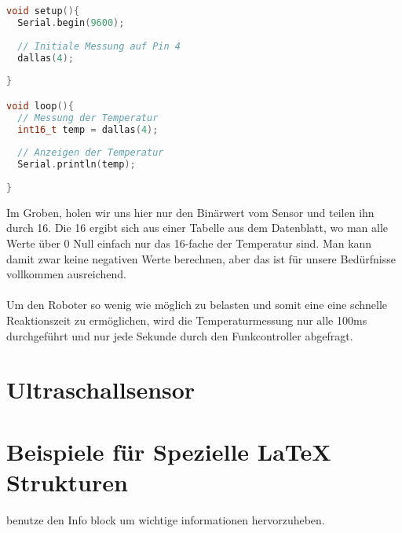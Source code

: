 \documentclass[12pt]{article}
\begin{document}
\begin{file}[DS18B20-2]
		
        \begin{lstlisting}[language=C++, inputencoding={utf8}, extendedchars=false]     
void setup(){
  Serial.begin(9600);
	
  // Initiale Messung auf Pin 4
  dallas(4);
  
}

void loop(){
  // Messung der Temperatur
  int16_t temp = dallas(4);
  
  // Anzeigen der Temperatur
  Serial.println(temp);
  
}

        \end{lstlisting}
        
\end{file}
Im Groben, holen wir uns hier nur den Binärwert vom Sensor und teilen ihn durch 16. Die 16 ergibt sich aus einer Tabelle aus dem Datenblatt, wo man alle Werte über 0 Null einfach nur das 16-fache der Temperatur sind. Man kann damit zwar keine negativen Werte berechnen, aber das ist für unsere Bedürfnisse vollkommen ausreichend.\\
\\
Um den Roboter so wenig wie möglich zu belasten und somit eine eine schnelle Reaktionszeit zu ermöglichen, wird die Temperaturmessung nur alle 100ms durchgeführt und nur jede Sekunde durch den Funkcontroller abgefragt.  

\newpage
\section{Ultraschallsensor} %

\newpage
\section{Beispiele für Spezielle LaTeX Strukturen}

\begin{info} %
	benutze den Info block um wichtige informationen hervorzuheben.
\end{info}

\end{document}
